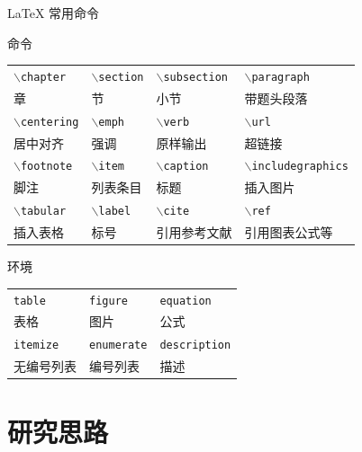 \documentclass{beamer}
\def\cmd#1{\texttt{\color{red}\footnotesize $\backslash$#1}}
\def\env#1{\texttt{\color{blue}\footnotesize #1}}
\begin{document}
	\begin{frame}[fragile]{\LaTeX{} 常用命令}
		\begin{exampleblock}{命令}
			\centering
			\footnotesize
			\begin{tabular}{llll}
				\cmd{chapter} & \cmd{section} & \cmd{subsection} & \cmd{paragraph} \\
				章 & 节 & 小节 & 带题头段落 \\ \hline
				\cmd{centering} & \cmd{emph} & \cmd{verb} & \cmd{url} \\
				居中对齐 & 强调 & 原样输出 & 超链接 \\ \hline
				\cmd{footnote} & \cmd{item} & \cmd{caption} & \cmd{includegraphics}  \\
				脚注 & 列表条目 & 标题 & 插入图片 \\ \hline
				\cmd{tabular} & \cmd{label} & \cmd{cite} & \cmd{ref} \\
				插入表格 & 标号 & 引用参考文献 & 引用图表公式等 \\ \hline
			\end{tabular}
		\end{exampleblock}
		\begin{exampleblock}{环境}
			\centering
			\footnotesize
			\begin{tabular}{lll}
				\env{table} & \env{figure} & \env{equation}\\
				表格 & 图片 & 公式 \\\hline
				\env{itemize} & \env{enumerate} & \env{description}\\
				无编号列表 & 编号列表 & 描述 \\\hline
			\end{tabular}
		\end{exampleblock}
	\end{frame}
	
	\section{研究思路}	
	
\end{document}
